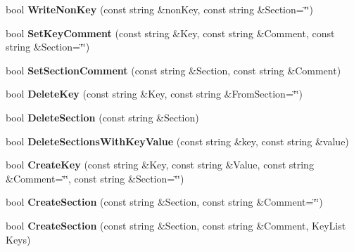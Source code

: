 \begin{DoxyCompactItemize}
\item 
\hypertarget{classrr_1_1_ini_file_a05b1dbd4fc8bde379736870cc26fe7db}{bool {\bfseries Write\-Non\-Key} (const string \&non\-Key, const string \&Section=\char`\"{}\char`\"{})}\label{classrr_1_1_ini_file_a05b1dbd4fc8bde379736870cc26fe7db}

\item 
\hypertarget{classrr_1_1_ini_file_a368f38bf1369323541d27087a64c6633}{bool {\bfseries Set\-Key\-Comment} (const string \&Key, const string \&Comment, const string \&Section=\char`\"{}\char`\"{})}\label{classrr_1_1_ini_file_a368f38bf1369323541d27087a64c6633}

\item 
\hypertarget{classrr_1_1_ini_file_a09070f111aaa9380c509a6df0f51d10f}{bool {\bfseries Set\-Section\-Comment} (const string \&Section, const string \&Comment)}\label{classrr_1_1_ini_file_a09070f111aaa9380c509a6df0f51d10f}

\item 
\hypertarget{classrr_1_1_ini_file_a04bc7759e92239370fcbebb263d8d882}{bool {\bfseries Delete\-Key} (const string \&Key, const string \&From\-Section=\char`\"{}\char`\"{})}\label{classrr_1_1_ini_file_a04bc7759e92239370fcbebb263d8d882}

\item 
\hypertarget{classrr_1_1_ini_file_a1b3bd5bfb77e49330a4c7b886d162537}{bool {\bfseries Delete\-Section} (const string \&Section)}\label{classrr_1_1_ini_file_a1b3bd5bfb77e49330a4c7b886d162537}

\item 
\hypertarget{classrr_1_1_ini_file_abadf22edc3ce9e12d8ad03f554f90d3e}{bool {\bfseries Delete\-Sections\-With\-Key\-Value} (const string \&key, const string \&value)}\label{classrr_1_1_ini_file_abadf22edc3ce9e12d8ad03f554f90d3e}

\item 
\hypertarget{classrr_1_1_ini_file_a7eebc3708fd1cb4b29afa08730fc3f50}{bool {\bfseries Create\-Key} (const string \&Key, const string \&Value, const string \&Comment=\char`\"{}\char`\"{}, const string \&Section=\char`\"{}\char`\"{})}\label{classrr_1_1_ini_file_a7eebc3708fd1cb4b29afa08730fc3f50}

\item 
\hypertarget{classrr_1_1_ini_file_adc60e078656f62ad2fd6646b227c8ebc}{bool {\bfseries Create\-Section} (const string \&Section, const string \&Comment=\char`\"{}\char`\"{})}\label{classrr_1_1_ini_file_adc60e078656f62ad2fd6646b227c8ebc}

\item 
\hypertarget{classrr_1_1_ini_file_aa61d11c5887653f29e7af627b8c664f0}{bool {\bfseries Create\-Section} (const string \&Section, const string \&Comment, Key\-List Keys)}\label{classrr_1_1_ini_file_aa61d11c5887653f29e7af627b8c664f0}


\end{DoxyCompactItemize}
